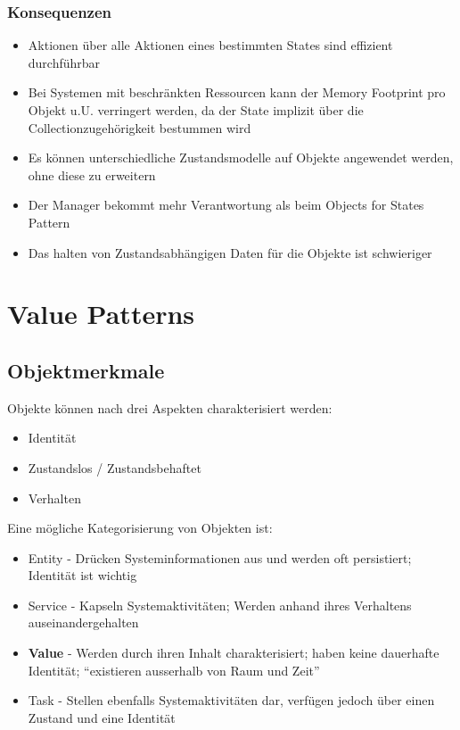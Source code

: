 \subsubsection*{Konsequenzen}

\begin{itemize}
	\item Aktionen über alle Aktionen eines bestimmten States sind effizient durchführbar
	\item Bei Systemen mit beschränkten Ressourcen kann der Memory Footprint pro Objekt u.U. verringert werden, da der State implizit über die Collectionzugehörigkeit bestummen wird
	\item Es können unterschiedliche Zustandsmodelle auf Objekte angewendet werden, ohne diese zu erweitern
	\item Der Manager bekommt mehr Verantwortung als beim Objects for States Pattern
	\item Das halten von Zustandsabhängigen Daten für die Objekte ist schwieriger
\end{itemize}

\section{Value Patterns}

\subsection*{Objektmerkmale}

Objekte können nach drei Aspekten charakterisiert werden:

\begin{itemize}
	\item Identität
	\item Zustandslos / Zustandsbehaftet
	\item Verhalten
\end{itemize}

Eine mögliche Kategorisierung von Objekten ist:

\begin{itemize}
	\item Entity - Drücken Systeminformationen aus und werden oft persistiert; Identität ist wichtig
	\item Service - Kapseln Systemaktivitäten; Werden anhand ihres Verhaltens auseinandergehalten
	\item \textbf{Value} - Werden durch ihren Inhalt charakterisiert; haben keine dauerhafte Identität; ``existieren ausserhalb von Raum und Zeit''
	\item Task - Stellen ebenfalls Systemaktivitäten dar, verfügen jedoch über einen Zustand und eine Identität
\end{itemize}

